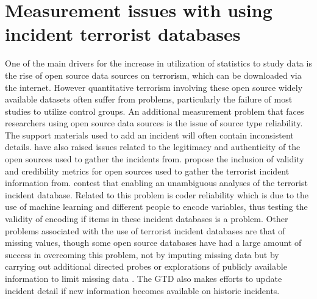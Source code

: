 \section{Measurement issues with using incident terrorist databases} \label{sec:markermeasdif}
One of the main drivers for the increase in utilization of statistics to study data is the rise of open source data sources on terrorism, which can be downloaded via the internet. However quantitative terrorism involving these open source widely available datasets often suffer from problems, particularly the failure of most studies to utilize control groups. An additional measurement problem that faces researchers using open source data sources is the issue of source type reliability. The support materials used to add an incident will often contain inconsistent details. \citep{ackerman2016speaking} have also raised issues related to the legitimacy and authenticity of the open sources used to gather the incidents from. \citep{ackerman2016speaking} propose the inclusion of validity and credibility metrics for  open sources used to gather the terrorist incident information from. \citep{ackerman2016speaking} contest that enabling  an unambiguous analyses of the terrorist incident database. Related to this problem is coder reliability which is due to the use of machine learning and different people to encode variables, thus testing the validity of encoding if items in these incident databases is a problem. 
Other problems associated with the use of terrorist incident databases are that of missing values, though some open source databases have had a large amount of success in overcoming this problem, not by imputing missing data but by carrying out additional directed  probes or explorations of publicly available information to limit missing data \citep{parkin2012developing}. The GTD also makes efforts to update incident detail if new information becomes available on historic incidents.


